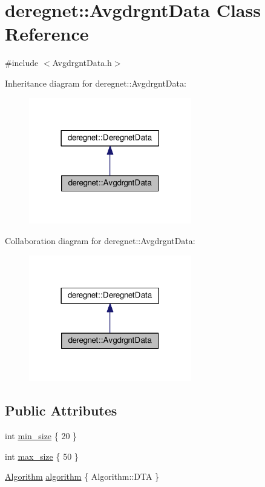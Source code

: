 \hypertarget{classderegnet_1_1AvgdrgntData}{}\section{deregnet\+:\+:Avgdrgnt\+Data Class Reference}
\label{classderegnet_1_1AvgdrgntData}


{\ttfamily \#include $<$Avgdrgnt\+Data.\+h$>$}



Inheritance diagram for deregnet\+:\+:Avgdrgnt\+Data\+:\nopagebreak
\begin{figure}[H]
\begin{center}
\leavevmode
\includegraphics[width=201pt]{classderegnet_1_1AvgdrgntData__inherit__graph}
\end{center}
\end{figure}


Collaboration diagram for deregnet\+:\+:Avgdrgnt\+Data\+:\nopagebreak
\begin{figure}[H]
\begin{center}
\leavevmode
\includegraphics[width=201pt]{classderegnet_1_1AvgdrgntData__coll__graph}
\end{center}
\end{figure}
\subsection*{Public Attributes}
\begin{DoxyCompactItemize}
\item 
int \hyperlink{classderegnet_1_1AvgdrgntData_a733e0cd627433fca043a7f9b70af18c3}{min\+\_\+size} \{ 20 \}
\item 
int \hyperlink{classderegnet_1_1AvgdrgntData_a9e844158e12d5e1c4d519c492cffeb17}{max\+\_\+size} \{ 50 \}
\item 
\hyperlink{namespacederegnet_ad59156f873b7ab02d384164b900cd874}{Algorithm} \hyperlink{classderegnet_1_1AvgdrgntData_aa75d6acc2d63aa589651c705eaf89280}{algorithm} \{ Algorithm\+::\+D\+TA \}
\end{DoxyCompactItemize}
